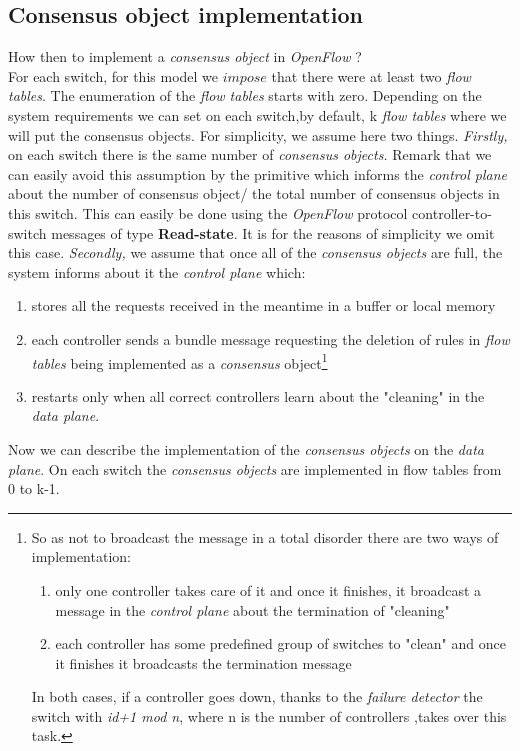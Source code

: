 \documentclass{article}
\theoremstyle{remark}
\begin{document}
\subsection{Consensus object implementation}
How then to implement a \emph{consensus object} in \emph{OpenFlow} ? \\
For each switch, for this model we $impose$ that there were at least two \emph{flow tables}. The enumeration of the \emph{flow tables} starts with zero. Depending on the system requirements we can set on each switch,by default, k \emph{flow tables} where we will put the consensus objects. For simplicity, we assume here two things. \emph{Firstly,} on each switch there is the same number of \emph{consensus objects.} Remark that we can easily avoid this assumption by the primitive which informs the \emph{control plane} about the number of consensus object/ the total number of consensus objects in this switch. This can easily be done using the \emph{OpenFlow} protocol controller-to-switch messages of type \textbf{Read-state}. It is for the reasons of simplicity we omit this case. \emph{Secondly,} we assume that once all of the \emph{consensus objects} are full, the system informs about it the \emph{control plane} which:
\begin{enumerate}
\item stores all the requests received in the meantime in a buffer or local memory
\item each controller sends a bundle message requesting the deletion of rules in \emph{flow tables} being implemented as a \emph{consensus} object\footnote{So as not to broadcast the message in a total disorder there are two ways of implementation:
\begin{enumerate}
\item only one controller takes care of it and once it finishes, it broadcast a message in the \emph{control plane} about the termination of "cleaning"
\item each controller has some predefined group of switches to "clean" and once it finishes it broadcasts the termination message
\end{enumerate}
In both cases, if a controller goes down, thanks to the \emph{failure detector} the switch with \emph{id+1 mod n}, where n is the number of controllers ,takes over this task.}
\item restarts only when all correct controllers learn about the "cleaning" in the \emph{data plane}. 
\end{enumerate}
Now we can describe the implementation of the \emph{consensus objects} on the \emph{data plane}. On each switch the \emph{consensus objects} are implemented in flow tables from 0 to k-1.
\end{document}
